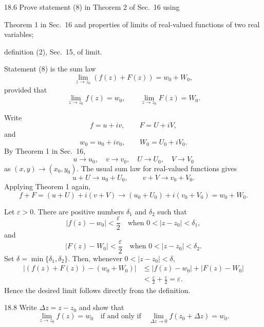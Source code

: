 \documentclass[11pt,oneside]{article}
\begin{document}

\begin{exercise}{18.6}
Prove statement (8) in Theorem 2 of Sec.~16 using
\begin{exercisesubparts}
    \item Theorem 1 in Sec.~16 and properties of limits of real-valued functions of two real variables;
    \item definition (2), Sec.~15, of limit.
\end{exercisesubparts}
\end{exercise}

\begin{solution}
Statement (8) is the sum law
\[
    \lim_{z\to z_0}(f(z)+F(z))=w_0+W_0,
\]
provided that
\[
    \lim_{z\to z_0}f(z)=w_0,
    \qquad
    \lim_{z\to z_0}F(z)=W_0.
\]
\begin{exercisesubparts}
    \item Write
    \[
        f=u+iv, \qquad F=U+iV,
    \]
    and
    \[
        w_0=u_0+iv_0, \qquad W_0=U_0+iV_0.
    \]
    By Theorem 1 in Sec.~16,
    \[
        u\to u_0, \quad v\to v_0, \quad U\to U_0, \quad V\to V_0
    \]
    as \((x, y)\to(x_0, y_0)\). The usual sum law for real-valued functions gives
    \[
        u+U\to u_0+U_0,
        \qquad
        v+V\to v_0+V_0.
    \]
    Applying Theorem 1 again,
    \[
        f+F=(u+U)+i(v+V)\longrightarrow
        (u_0+U_0)+i(v_0+V_0)=w_0+W_0.
    \]

    \item Let \(\varepsilon>0\). There are positive numbers \(\delta_1\) and \(\delta_2\) such that
    \[
        |f(z)-w_0|<\frac\varepsilon2
        \quad\text{when }0<|z-z_0|<\delta_1,
    \]
    and
    \[
        |F(z)-W_0|<\frac\varepsilon2
        \quad\text{when }0<|z-z_0|<\delta_2.
    \]
    Set \(\delta=\min\{\delta_1, \delta_2\}\). Then, whenever \(0<|z-z_0|<\delta\),
    \[
    \begin{aligned}
        |(f(z)+F(z))-(w_0+W_0)|
        &\le |f(z)-w_0|+|F(z)-W_0|\\
        &<\frac\varepsilon2+\frac\varepsilon2
        =\varepsilon.
    \end{aligned}
    \]
    Hence the desired limit follows directly from the definition.
\end{exercisesubparts}
\end{solution}

\begin{exercise}{18.8}
Write \(\Delta z=z-z_0\) and show that
\[
    \lim_{z\to z_0}f(z)=w_0
    \quad\text{if and only if}\quad
    \lim_{\Delta z\to0}f(z_0+\Delta z)=w_0.
\]
\end{exercise}
\end{document}
